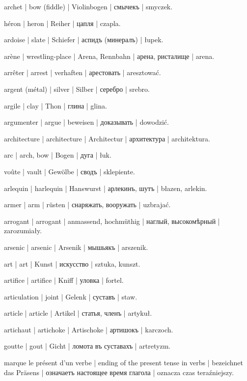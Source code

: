 \begin{outdent}{1em}
archet | bow (fiddle) | Violinbogen | смычекъ | smyczek.

héron | heron | Reiher | цапля | czapla.

ardoise | slate | Schiefer | аспидъ (минералъ) | łupek.

arène | wrestling-place | Arena, Rennbahn | арена, ристалище | arena.

arrêter | arrest | verhaften | арестовать | aresztować.

argent (métal) | silver | Silber | серебро | srebro.

argile | clay | Thon | глина | glina.

argumenter | argue | beweisen | доказывать | dowodzić.

architecture | architecture | Architectur | архитектура | architektura.

arc | arch, bow | Bogen | дуга | łuk.

\uvsubentry{}
voûte | vault | Gewölbe | сводъ | sklepiente.

arlequin | harlequin | Hanswurst | арлекинъ, шутъ | błazen,
arlekin.

armer | arm | rüsten | снаряжать, вооружать | uzbrajać.

arrogant | arrogant | anmassend, hochmüthig | наглый,
высокомѣрный | zarozumiały.

arsenic | arsenic | Arsenik | мышьякъ | arszenik.

art | art | Kunst | искусство | sztuka, kunszt.

artifice | artifice | Kniff | уловка | fortel.

articulation | joint | Gelenk | суставъ | staw.

article | article | Artikel | статья, членъ | artykuł.

artichaut | artichoke | Artischoke | артишокъ | karczoch.

goutte | gout | Gicht | ломота въ суставахъ | artretyzm.

marque le présent d’un verbe | ending of the present tense in
verbs | bezeichnet das Präsens | означаетъ настоящее время глагола | oznacza
czas teraźniejszy.


\end{outdent}
